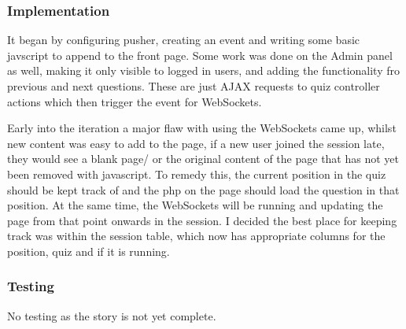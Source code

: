 \subsubsection{Implementation}
It began by configuring pusher, creating an event and writing some basic javscript to append to the front page. Some work was done on the Admin panel as well, making it only visible to logged in users, and adding the functionality fro previous and next questions. These are just AJAX requests to quiz controller actions which then trigger the event for WebSockets.

Early into the iteration a major flaw with using the WebSockets came up, whilst new content was easy to add to the page, if a new user joined the session late, they would see a blank page/ or the original content of the page that has not yet been removed with javascript. To remedy this, the current position in the quiz should be kept track of and the php on the page should load the question in that position. At the same time, the WebSockets will be running and updating the page from that point onwards in the session. I decided the best place for keeping track was within the session table, which now has appropriate columns for the position, quiz and if it is running.
\subsubsection{Testing}
No testing as the story is not yet complete.
\newpage
